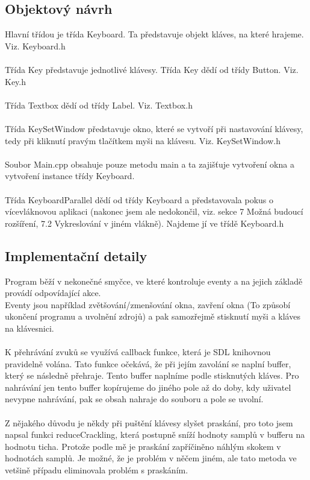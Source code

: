 \documentclass[12pt]{article}
\begin{document}
	\newpage
	\subsection{Objektový návrh}
	Hlavní třídou je třída Keyboard. Ta představuje objekt kláves, na které hrajeme. Viz. Keyboard.h
	\\	
	\\
	Třída Key představuje jednotlivé klávesy. Třída Key dědí od třídy Button. Viz. Key.h
	\\
	\\
	Třída Textbox dědí od třídy Label. Viz. Textbox.h
	\\
	\\
	Třída KeySetWindow představuje okno, které se vytvoří při nastavování klávesy, tedy při kliknutí pravým tlačítkem myši na klávesu. Viz. KeySetWindow.h
	\\
	\\
	Soubor Main.cpp obsahuje pouze metodu main a ta zajišťuje vytvoření okna a vytvoření instance třídy Keyboard.
	\\
	\\ 
	Třída KeyboardParallel dědí od třídy Keyboard a představovala pokus o vícevláknovou aplikaci (nakonec jsem ale nedokončil, viz. sekce 7 Možná budoucí rozšíření, 7.2 Vykreslování v jiném vlákně). Najdeme jí ve třídě Keyboard.h
	
	\newpage
	\subsection{Implementační detaily}
	Program běží v nekonečné smyčce, ve které kontroluje eventy a na jejich základě provádí odpovídající akce.
	\\
	 Eventy jsou například zvětšování/zmenšování okna, zavření okna (To způsobí ukončení programu a uvolnění zdrojů) a pak samozřejmě stisknutí myši a kláves na klávesnici.
	\\
	\\
	K přehrávání zvuků se využívá callback funkce, která je SDL knihovnou pravidelně volána. Tato funkce očekává, že při jejím zavolání se naplní buffer, který se následně přehraje. Tento buffer naplníme podle stisknutých kláves. Pro nahrávání jen tento buffer kopírujeme do jiného pole až do doby, kdy uživatel nevypne nahrávání, pak se obsah nahraje do souboru a pole se uvolní. 
	\\ 
	\\
	Z nějakého důvodu je někdy při puštění klávesy slyšet praskání, pro toto jsem napsal funkci reduceCrackling, která postupně sníží hodnoty samplů v bufferu na hodnotu ticha. Protože podle mě je praskání zapříčiněno náhlým skokem v hodnotách samplů. Je možné, že je problém v něčem jiném, ale tato metoda ve vetšině případu eliminovala problém s praskáním.
	
\end{document}

